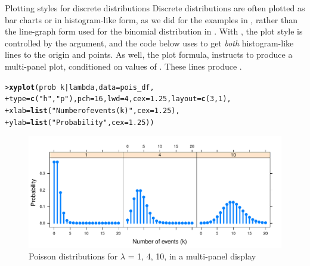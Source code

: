 \documentclass[10pt,krantz2]{krantz}\usepackage[]{graphicx}\usepackage[]{color}
\makeatletter
\newcommand{\hlnum}[1]{\textcolor[rgb]{0.686,0.059,0.569}{#1}}%
\newcommand{\hlstr}[1]{\textcolor[rgb]{0.192,0.494,0.8}{#1}}%
\newcommand{\hlopt}[1]{\textcolor[rgb]{0,0,0}{#1}}%
\newcommand{\hlstd}[1]{\textcolor[rgb]{0.345,0.345,0.345}{#1}}%
\newcommand{\hlkwc}[1]{\textcolor[rgb]{0.333,0.667,0.333}{#1}}%
\newcommand{\hlkwd}[1]{\textcolor[rgb]{0.737,0.353,0.396}{\textbf{#1}}}%
\newenvironment{kframe}{%
 \def\at@end@of@kframe{}%
 \ifinner\ifhmode%
  \def\at@end@of@kframe{\end{minipage}}%
  \begin{minipage}{\columnwidth}%
 \fi\fi%
 \def\FrameCommand##1{\hskip\@totalleftmargin \hskip-\fboxsep
 \colorbox{shadecolor}{##1}\hskip-\fboxsep
     \hskip-\linewidth \hskip-\@totalleftmargin \hskip\columnwidth}%
 \MakeFramed {\advance\hsize-\width
   \@totalleftmargin\z@ \linewidth\hsize
   \@setminipage}}%
 {\par\unskip\endMakeFramed%
 \at@end@of@kframe}
\newenvironment{knitrout}{}{} %
\renewenvironment{knitrout}{\small\renewcommand{\baselinestretch}{.85}}{} %
\makeatother
\begin{document}
\begin{Example}{Plotting styles for discrete distributions}
Discrete distributions are often plotted as bar charts or in histogram-like
form, as we did for the examples in ,
rather than the line-graph form used for the binomial distribution in
.  With , the plot style is controlled
by the  argument, and the code below uses 
to get \emph{both} histogram-like lines to the origin and points.
As well, the plot formula,  instructs 
to produce a multi-panel plot, conditioned on values of .
These lines produce .

\begin{knitrout}
\color{fgcolor}\begin{kframe}
\begin{alltt}
\hlstd{> }\hlkwd{xyplot}\hlstd{(prob} \hlopt{~} \hlstd{k} \hlopt{|} \hlstd{lambda,} \hlkwc{data} \hlstd{= pois_df,}
\hlstd{+ }  \hlkwc{type} \hlstd{=} \hlkwd{c}\hlstd{(}\hlstr{"h"}\hlstd{,} \hlstr{"p"}\hlstd{),} \hlkwc{pch} \hlstd{=} \hlnum{16}\hlstd{,} \hlkwc{lwd} \hlstd{=} \hlnum{4}\hlstd{,} \hlkwc{cex} \hlstd{=} \hlnum{1.25}\hlstd{,} \hlkwc{layout} \hlstd{=} \hlkwd{c}\hlstd{(}\hlnum{3}\hlstd{,} \hlnum{1}\hlstd{),}
\hlstd{+ }  \hlkwc{xlab} \hlstd{=} \hlkwd{list}\hlstd{(}\hlstr{"Number of events (k)"}\hlstd{,} \hlkwc{cex} \hlstd{=} \hlnum{1.25}\hlstd{),}
\hlstd{+ }  \hlkwc{ylab} \hlstd{=} \hlkwd{list}\hlstd{(}\hlstr{"Probability"}\hlstd{,} \hlkwc{cex} \hlstd{=} \hlnum{1.25}\hlstd{))}
\end{alltt}
\end{kframe}\begin{figure}[!htbp]

\centerline{\includegraphics[width=\textwidth]{ch03/fig/dpois-xyplot1-1} }

\caption[Poisson distributions for ]{Poisson distributions for $\lambda$ = 1, 4, 10, in a multi-panel display\label{fig:dpois-xyplot1}}
\end{figure}



\end{knitrout}
\end{Example}
\end{document}
